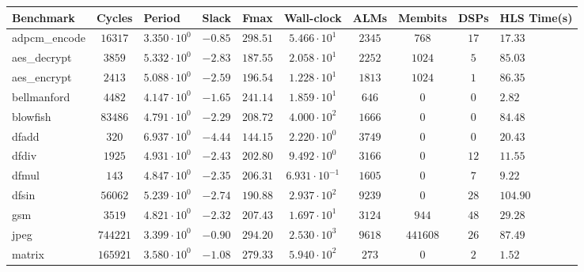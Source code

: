 \begin{tabular}{|l|c|HHc|c|c|c|cH|}
\hline
Benchmark     & Cycles       & Period                 & Slack     & Fmax       & Wall-clock              & ALMs      & Membits    & DSPs    & HLS Time(s) \\
\hline
adpcm\_encode & $ 16317    $ & $ 3.350 \cdot 10^{0} $ & $ -0.85 $ & $ 298.51 $ & $ 5.466 \cdot 10^{1}  $ & $ 2345  $ & $ 768    $ & $ 17  $ & $ 17.33   $ \\
aes\_decrypt  & $ 3859     $ & $ 5.332 \cdot 10^{0} $ & $ -2.83 $ & $ 187.55 $ & $ 2.058 \cdot 10^{1}  $ & $ 2252  $ & $ 1024   $ & $ 5   $ & $ 85.03   $ \\
aes\_encrypt  & $ 2413     $ & $ 5.088 \cdot 10^{0} $ & $ -2.59 $ & $ 196.54 $ & $ 1.228 \cdot 10^{1}  $ & $ 1813  $ & $ 1024   $ & $ 1   $ & $ 86.35   $ \\
bellmanford   & $ 4482     $ & $ 4.147 \cdot 10^{0} $ & $ -1.65 $ & $ 241.14 $ & $ 1.859 \cdot 10^{1}  $ & $ 646   $ & $ 0      $ & $ 0   $ & $ 2.82    $ \\
blowfish      & $ 83486    $ & $ 4.791 \cdot 10^{0} $ & $ -2.29 $ & $ 208.72 $ & $ 4.000 \cdot 10^{2}  $ & $ 1666  $ & $ 0      $ & $ 0   $ & $ 84.48   $ \\
dfadd         & $ 320      $ & $ 6.937 \cdot 10^{0} $ & $ -4.44 $ & $ 144.15 $ & $ 2.220 \cdot 10^{0}  $ & $ 3749  $ & $ 0      $ & $ 0   $ & $ 20.43   $ \\
dfdiv         & $ 1925     $ & $ 4.931 \cdot 10^{0} $ & $ -2.43 $ & $ 202.80 $ & $ 9.492 \cdot 10^{0}  $ & $ 3166  $ & $ 0      $ & $ 12  $ & $ 11.55   $ \\
dfmul         & $ 143      $ & $ 4.847 \cdot 10^{0} $ & $ -2.35 $ & $ 206.31 $ & $ 6.931 \cdot 10^{-1} $ & $ 1605  $ & $ 0      $ & $ 7   $ & $ 9.22    $ \\
dfsin         & $ 56062    $ & $ 5.239 \cdot 10^{0} $ & $ -2.74 $ & $ 190.88 $ & $ 2.937 \cdot 10^{2}  $ & $ 9239  $ & $ 0      $ & $ 28  $ & $ 104.90  $ \\
gsm           & $ 3519     $ & $ 4.821 \cdot 10^{0} $ & $ -2.32 $ & $ 207.43 $ & $ 1.697 \cdot 10^{1}  $ & $ 3124  $ & $ 944    $ & $ 48  $ & $ 29.28   $ \\
jpeg          & $ 744221   $ & $ 3.399 \cdot 10^{0} $ & $ -0.90 $ & $ 294.20 $ & $ 2.530 \cdot 10^{3}  $ & $ 9618  $ & $ 441608 $ & $ 26  $ & $ 87.49   $ \\
matrix        & $ 165921   $ & $ 3.580 \cdot 10^{0} $ & $ -1.08 $ & $ 279.33 $ & $ 5.940 \cdot 10^{2}  $ & $ 273   $ & $ 0      $ & $ 2   $ & $ 1.52    $ \\

\end{tabular}
